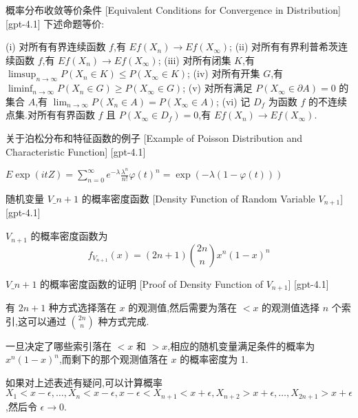 \documentclass[UTF8]{ctexart}
\begin{document}
    \begin{thm}
        {概率分布收敛等价条件}
        [Equivalent Conditions for Convergence in Distribution]
        [gpt-4.1]
        下述命题等价:

(i) 对所有有界连续函数 $f$,有 $E f (X_{n}) \to E f (X_{\infty})$;
(ii) 对所有有界利普希茨连续函数 $f$,有 $E f (X_{n}) \to E f (X_{\infty})$;
(iii) 对所有闭集 $K$,有 $\limsup_{n \to \infty} P(X_{n} \in K) \leq P(X_{\infty} \in K)$;
(iv) 对所有开集 $G$,有 $\liminf_{n \to \infty} P(X_{n} \in G) \geq P(X_{\infty} \in G)$;
(v) 对所有满足 $P(X_{\infty} \in \partial A) = 0$ 的集合 $A$,有 $\lim_{n \to \infty} P(X_{n} \in A) = P(X_{\infty} \in A)$;
(vi) 记 $D_{f}$ 为函数 $f$ 的不连续点集.对所有有界函数 $f$ 且 $P(X_{\infty} \in D_{f}) = 0$,有 $E f (X_{n}) \to E f (X_{\infty})$.

    \end{thm}
    
    
    
    \begin{xmp}
        {关于泊松分布和特征函数的例子}
        [Example of Poisson Distribution and Characteristic Function]
        [gpt-4.1]
        
$E \exp ( i t Z ) = \sum_{n = 0}^{\infty} e^{-\lambda} \frac{\lambda^{n}}{n!} \varphi(t)^{n} = \exp(-\lambda (1 - \varphi(t)))$

    \end{xmp}
    
    
    
    \begin{lma}
        {随机变量 $V\_{n+1}$ 的概率密度函数}
        [Density Function of Random Variable $V_{n+1}$]
        [gpt-4.1]
        
$V_{n+1}$ 的概率密度函数为
\[
f_{V_{n+1}}(x) = (2n+1) \binom{2n}{n} x^n (1-x)^n
\]

    \end{lma}
    
    
    
    \begin{prf}
        {$V\_{n+1}$ 的概率密度函数的证明}
        [Proof of Density Function of $V_{n+1}$]
        [gpt-4.1]
        
有 $2n+1$ 种方式选择落在 $x$ 的观测值,然后需要为落在 $< x$ 的观测值选择 $n$ 个索引,这可以通过 $\binom{2n}{n}$ 种方式完成.

一旦决定了哪些索引落在 $< x$ 和 $> x$,相应的随机变量满足条件的概率为 $x^n (1-x)^n$,而剩下的那个观测值落在 $x$ 的概率密度为 1.

如果对上述表述有疑问,可以计算概率 $X_1 < x-\epsilon, \ldots, X_n < x-\epsilon, x-\epsilon < X_{n+1} < x+\epsilon, X_{n+2} > x+\epsilon, \ldots, X_{2n+1} > x+\epsilon$,然后令 $\epsilon \to 0$.

    \end{prf}
    
\end{document}
